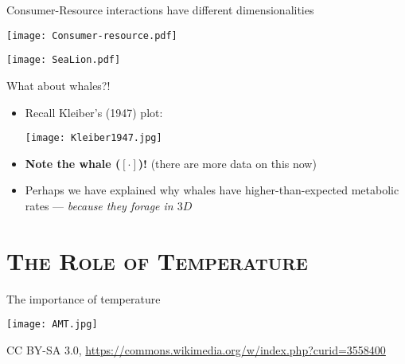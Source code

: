 \begin{frame}{Consumer-Resource interactions have different dimensionalities}

  \begin{center}
    \texttt{[image: Consumer-resource.pdf]}  
  \end{center}
  
  \end{frame} 

\begin{frame}[plain]{}
  \begin{center}
    \texttt{[image: SeaLion.pdf]}
  \end{center}
  \end{frame}
  
  \begin{frame}{What about whales?!}
  
    \begin{itemize}[<+->]\setlength{\itemindent}{0em} \itemsep3pt 
       \item Recall Kleiber's (1947) plot: \\
      \begin{center}
        \texttt{[image: Kleiber1947.jpg]}
      \end{center}
      \item {\bf Note the whale ($[\cdot]$)!} (there are more data on this now)
      \item Perhaps we have explained why whales have 
      higher-than-expected metabolic rates  --- \it because they forage in $3D$
    \end{itemize}
  
  \end{frame}

\section{\scshape The Role of Temperature}

\begin{frame}{The importance of temperature}

  \begin{center}
    \texttt{[image: AMT.jpg]}\\
      {\tiny CC BY-SA 3.0, \url{https://commons.wikimedia.org/w/index.php?curid=3558400}\par}
   \end{center}
    
  \end{frame}
  
